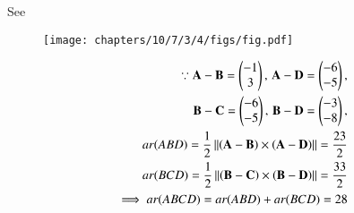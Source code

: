See 
\begin{figure}[H]
 \begin{center}
  \texttt{[image: chapters/10/7/3/4/figs/fig.pdf]}
 \end{center}
\caption{}
\label{fig:chapters/10/7/3/4/Fig1}
\end{figure}
\begin{align}
\because	\mathbf{A}- \mathbf{B} =\begin{pmatrix}-1\\3\end{pmatrix},\,
	  \mathbf{A}- \mathbf{D} =\begin{pmatrix}-6\\-5\end{pmatrix},
	  \\
	\mathbf{B}- \mathbf{C} =\begin{pmatrix}-6\\-5\end{pmatrix},\,
	  \mathbf{B}- \mathbf{D} =\begin{pmatrix}-3\\-8\end{pmatrix},
	  \\
	  ar(ABD)=\frac{1}{2} \left\lVert\left(\mathbf{A}-\mathbf{B}\right)  \times 
   \left(\mathbf{A}- \mathbf{D}\right)\right\rVert 
	=	\frac{23}{2}
	\\
	  ar(BCD)=\frac{1}{2} \left\lVert\left(\mathbf{B}-\mathbf{C}\right)  \times 
   \left(\mathbf{B}- \mathbf{D}\right)\right\rVert 
	=	\frac{33}{2}
	\\
\implies	ar(ABCD)=  ar(ABD) +  ar(BCD)
	= 28
\end{align}

